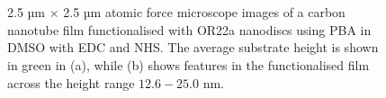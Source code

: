 \documentclass[
  a4paper,
]{scrbook}
\begin{document}
\begin{figure}
\begin{minipage}[t]{0.03\linewidth}
{\centering 


}

\end{minipage}%
%
\begin{minipage}[t]{0.01\linewidth}

{\centering 

~

}

\end{minipage}%
%
\begin{minipage}[t]{0.45\linewidth}

{\centering 


}

\end{minipage}%
%
\begin{minipage}[t]{0.01\linewidth}

{\centering 

~

}

\end{minipage}%

\caption{\label{fig-EDCNHS-AFM-comparison}2.5 µm \(\times\) 2.5 µm
atomic force microscope images of a carbon nanotube film functionalised
with OR22a nanodiscs using PBA in DMSO with EDC and NHS. The average
substrate height is shown in green in (a), while (b) shows features in
the functionalised film across the height range \(12.6-25.0\) nm.}

\end{figure}
\end{document}
